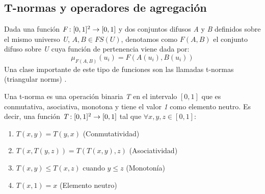 \subsection{T-normas y operadores de agregación}
Dada una función \begin{math}\emph{F}:[0,1]^2\rightarrow[0,1]\end{math} y dos conjuntos difusos \emph{A} y \emph{B} definidos sobre el mismo universo \emph{U}, \begin{math}A,B\in FS(U)\end{math}, denotamos como \begin{math}F(A,B)\end{math} el conjunto difuso sobre \emph{U} cuya función de pertenencia viene dada por:
\begin{equation}
\mu_{F(A,B)}(u_{i}) = F(A(u_{i}),B(u_{i}))
\end{equation}
Una clase importante de este tipo de funciones son las llamadas t-normas (triangular norms) \cite{klement2000triangular}.
\begin{definition}
Una t-norma es una operación binaria \emph{T} en el intervalo $[0,1]$ que es conmutativa, asociativa, monotona y tiene el valor \emph{1} como elemento neutro. Es decir, una función $\emph{T} : [0,1]^2 \rightarrow [0,1]$ tal que $\forall x,y,z \in [0,1]$:
\begin{enumerate}[label=(T\arabic*),ref=(T\arabic*)]
   \item $T(x,y) = T(y,x)$ (Conmutatividad)\label{statement1}
   \item $T(x,T(y,z)) = T(T(x,y),z)$ (Asociatividad)\label{statement2}
   \item $T(x,y) \leq T(x,z)$ cuando $y \leq z$ (Monotonía)\label{statement3}
   \item $T(x,1) = x$ (Elemento neutro)\label{statement4}
  \end{enumerate}
\end{definition} 
